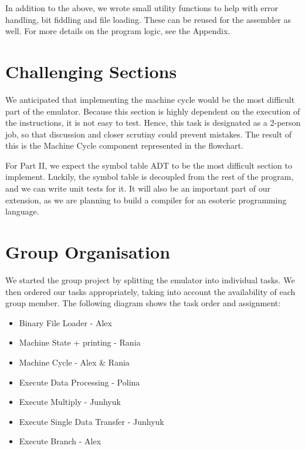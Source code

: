 \documentclass[11pt]{article}
\begin{document}
In addition to the above, we wrote small utility functions to help with error
handling, bit fiddling and file loading. These can be reused for the assembler
as well. For more details on the program logic, see the Appendix.

\section{Challenging Sections}

We anticipated that implementing the machine cycle would be the most difficult
part of the emulator. Because this section is highly dependent on the
execution of the instructions, it is not easy to test. Hence, this task is
designated as a 2-person job, so that discussion and closer scrutiny could
prevent mistakes. The result of this is the Machine Cycle component represented
in the flowchart.

\bigskip
For Part II, we expect the symbol table ADT to be the most difficult section
to implement. Luckily, the symbol table is decoupled from the rest of the
program, and we can write unit tests for it. It will also be an important part
of our extension, as we are planning to build a compiler for an esoteric
programming language.
\section{Group Organisation}

We started the group project by splitting the emulator into individual tasks.
We then ordered our tasks appropriately, taking into account the availability
of each group member. The following diagram shows the task order and assignment:
\begin{itemize}
    \item Binary File Loader - Alex
    \item Machine State + printing - Rania
    \item Machine Cycle - Alex \& Rania
    \item Execute Data Processing - Polina
    \item Execute Multiply - Junhyuk
    \item Execute Single Data Transfer - Junhyuk
    \item Execute Branch - Alex
\end{itemize}
\end{document}
